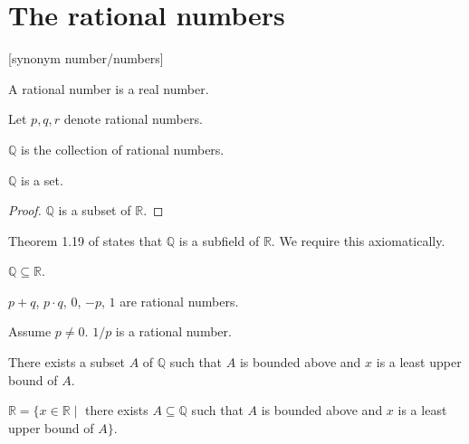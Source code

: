 \documentclass{article}
\begin{document}
\section{The rational numbers}

\begin{forthel}

[synonym number/numbers]

\begin{signature}[1 19a] A rational number is a real number.
\end{signature}

Let $p,q,r$ denote rational numbers.

\begin{definition} $\mathbb{Q}$ is the collection of rational numbers.
\end{definition}

\begin{theorem} $\mathbb{Q}$ is a set.
\end{theorem}
\begin{proof} $\mathbb{Q}$ is a subset of $\mathbb{R}$.
\end{proof}



\end{forthel}
Theorem 1.19 of \cite{Rudin} states that $\mathbb{Q}$ is a 
subfield of $\mathbb{R}$. We require this axiomatically.
\begin{forthel}

\begin{lemma} $\mathbb{Q} \subseteq \mathbb{R}$.\end{lemma}

\begin{axiom} $p + q$, $p \cdot q$, $0$, $-p$, $1$ are 
rational numbers.\end{axiom}

\begin{axiom} Assume $p \neq 0$. $1/p$ is a rational number.
\end{axiom}

\begin{axiom} There exists a subset $A$ of $\mathbb{Q}$ 
such that $A$ is bounded above and
$x$ is a least upper bound of $A$.
\end{axiom}

\begin{theorem} 
$\mathbb{R} = \{x \in \mathbb{R} \mid$ there exists $
A \subseteq \mathbb{Q}$ such that $
A$ is bounded above and $x$ is a least upper
bound of $A\}$.
\end{theorem}

\end{forthel}
\end{document}
